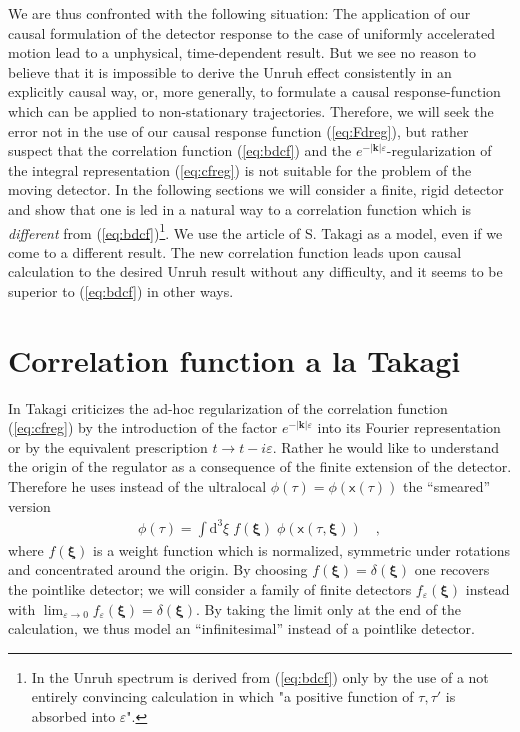\documentclass[a4paper,12pt]{article}
\newcommand{\eps}{\varepsilon}
\newcommand{\vk}{\mathbf{k}}
\newcommand{\vxi}{\boldsymbol{\xi}}
\newcommand{\vvx}{\mathsf x}
\newcommand{\lime}{\lim_{\eps\to0}}
\renewcommand{\d}{\mathrm{d}}
\begin{document}
\bigskip

We are thus confronted with the following situation: The application of our causal
formulation of the detector response to the case of uniformly accelerated motion 
lead to a unphysical, time-dependent result. But we see no 
reason to believe that it is impossible to derive the Unruh effect consistently
in an explicitly causal way, or, more generally, to formulate a causal response-function
which can be applied to non-stationary trajectories. Therefore, we will seek the error
not in the use of our causal response function (\ref{eq:Fdreg}), but rather suspect 
that the 
correlation function (\ref{eq:bdcf}) and the $e^{-|\vk|\eps}$-regularization 
of the integral representation (\ref{eq:cfreg}) is not suitable for the problem of the 
moving 
detector. In the following sections we will consider a finite, rigid detector and show
that one is led in a natural way to a correlation function which is {\em different} 
from (\ref{eq:bdcf})\footnote{In \cite{bd} the Unruh spectrum is derived from 
(\ref{eq:bdcf}) only by the use of a not entirely convincing calculation in which
"a positive function of $\tau,\tau'$ is absorbed into $\eps$".}. 
We use the article \cite{tak} of S. Takagi as a model, even if we 
come to 
a different result. The new correlation function leads upon causal calculation to the 
desired Unruh result without any difficulty, and it seems to be superior to 
(\ref{eq:bdcf}) in other ways.





\section{Correlation function a la Takagi}


In \cite{tak} Takagi criticizes the ad-hoc regularization of the correlation function
(\ref{eq:cfreg}) by the introduction of the factor $e^{-|\vk|\eps}$ into its 
Fourier representation
or by the equivalent prescription $t\to t-i\eps$. Rather he would like to understand
the origin of the regulator as a consequence of the finite extension of the detector.
Therefore he uses instead of the ultralocal $\phi(\tau)=\phi(\vvx(\tau))$ the 
``smeared'' version
\begin{eqnarray*}
\phi(\tau)=\int\d^3\xi\;f(\vxi)\;\phi(\vvx(\tau,\vxi))\quad,
\end{eqnarray*}
where $f(\vxi)$ is a weight function which is normalized, symmetric under rotations
and concentrated around the origin. By choosing $f(\vxi)=\delta(\vxi)$ one recovers
the pointlike detector; we will consider a family of finite detectors 
$f_\eps(\vxi)$ instead with $\lime f_\eps(\vxi)=\delta(\vxi)$. By taking the limit
only at the end of the calculation, we thus model an ``infinitesimal'' instead 
of a pointlike detector. 
\end{document}
